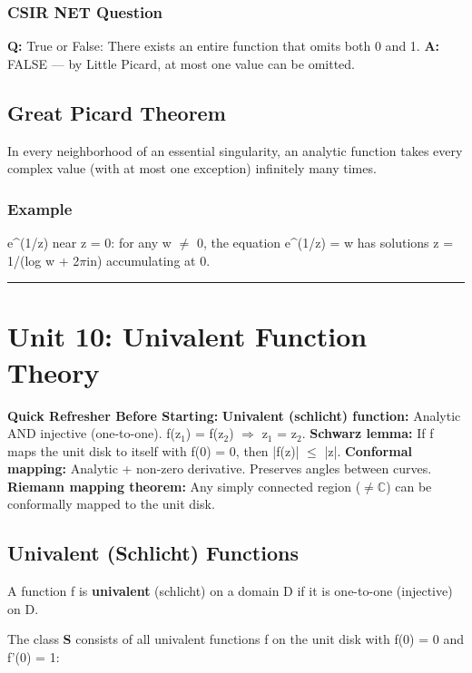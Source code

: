 \documentclass[12pt,a4paper,openany]{book}
\begin{document}
{{\subsubsection{ CSIR NET Question}
\textbf{Q:} True or False: There exists an entire function that omits both 0 and 1.
\textbf{A:} FALSE — by Little Picard, at most one value can be omitted.

\subsection{Great Picard Theorem}
In every neighborhood of an essential singularity, an analytic function takes every complex value (with at most one exception) infinitely many times.

\subsubsection{Example}
e^(1/z) near z = 0: for any w $\neq$ 0, the equation e^(1/z) = w has solutions z = 1/(log w + 2$\pi$in) accumulating at 0.

\bigskip\noindent\rule{\textwidth}{0.4pt}\bigskip

\section{Unit 10: Univalent Function Theory}

\begin{prereqbox}
 \textbf{Quick Refresher Before Starting:}
\textbf{Univalent (schlicht) function:} Analytic AND injective (one-to-one). f(z$_1$) = f(z$_2$) $\Longrightarrow$ z$_1$ = z$_2$.
\textbf{Schwarz lemma:} If f maps the unit disk to itself with f(0) = 0, then |f(z)| $\leq$ |z|.
\textbf{Conformal mapping:} Analytic + non-zero derivative. Preserves angles between curves.
\textbf{Riemann mapping theorem:} Any simply connected region ($\neq\mathbb{C}$) can be conformally mapped to the unit disk.
\end{prereqbox}


\subsection{Univalent (Schlicht) Functions}

A function f is \textbf{univalent} (schlicht) on a domain D if it is one-to-one (injective) on D.

The class \textbf{S} consists of all univalent functions f on the unit disk with f(0) = 0 and f'(0) = 1:

}}
\end{document}
